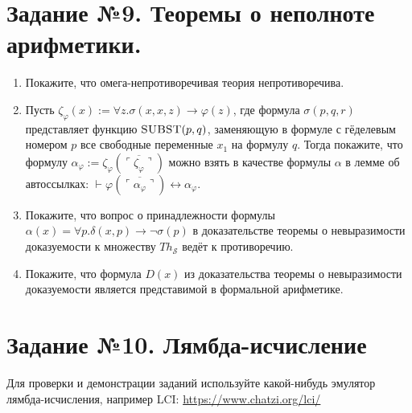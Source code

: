 \documentclass[10pt,a4paper,oneside]{article}
\begin{document}
\section*{Задание №9. Теоремы о неполноте арифметики.}
\begin{enumerate}
\item Покажите, что омега-непротиворечивая теория непротиворечива.
\item Пусть $\zeta_\varphi(x) := \forall z.\sigma (x,x,z) \rightarrow \varphi(z)$,
где формула $\sigma(p,q,r)$ представляет функцию $\textsc{SUBST}(p,q)$, заменяющую в формуле с гёделевым номером $p$
все свободные переменные $x_1$ на формулу $q$. Тогда покажите, что формулу $\alpha_\varphi := \zeta_\varphi(\overline{\ulcorner\zeta_\varphi\urcorner})$
можно взять в качестве формулы $\alpha$ в лемме об автоссылках: $\vdash \varphi(\overline{\ulcorner\alpha_\varphi\urcorner}) \leftrightarrow \alpha_\varphi$.

\item Покажите, что вопрос о принадлежности формулы $\alpha(x) = \forall p.\delta(x,p) \rightarrow \neg \sigma(p)$ в доказательстве 
теоремы о невыразимости доказуемости к множеству $Th_\mathcal{S}$ ведёт к противоречию.
\item Покажите, что формула $D(x)$ из доказательства теоремы о невыразимости доказуемости является представимой в формальной арифметике.
\end{enumerate}

\section*{Задание №10. Лямбда-исчисление}
Для проверки и демонстрации заданий используйте какой-нибудь эмулятор лямбда-исчисления,
например LCI: \url{https://www.chatzi.org/lci/}
\end{document}
